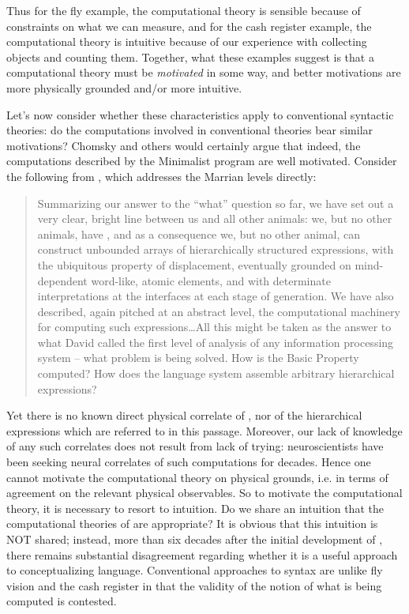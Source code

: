 Thus for the fly example, the computational theory is sensible because of constraints on what we can measure, and for the cash register example, the computational theory is intuitive because of our experience with collecting objects and counting them. Together, what these examples suggest is that a computational theory must be \textit{motivated} in some way, and better motivations are more physically grounded and/or more intuitive. 

Let's now consider whether these characteristics apply to conventional syntactic theories: do the computations involved in conventional theories bear similar motivations? Chomsky and others would certainly argue that indeed, the computations described by the Minimalist program are well motivated. Consider the following from \citet{BerwickChomsky2016}, which addresses the Marrian levels directly:

\begin{quote} 
Summarizing our answer to the “what” question so far, we have set out a very clear, bright line between us and all other animals: we, but no other animals, have , and as a consequence we, but no other animal, can construct unbounded arrays of hierarchically structured expressions, with the ubiquitous property of displacement, eventually grounded on mind-de\-pen\-dent word-like, atomic elements, and with determinate interpretations at the interfaces at each stage of generation. We have also described, again pitched at an abstract level, the computational machinery for computing such expressions…All this might be taken as the answer to what David \citet{Marr1982} called the first level of analysis of any information processing system -- what problem is being solved. How is the Basic Property computed? How does the language system assemble arbitrary hierarchical expressions? \citep[132]{BerwickChomsky2016}
\end{quote}

Yet there is no known direct physical correlate of , nor of the hierarchical expressions which are referred to in this passage. Moreover, our lack of knowledge of any such correlates does not result from lack of trying: neuroscientists have been seeking neural correlates of such computations for decades. Hence one cannot motivate the computational theory on physical grounds, i.e. in terms of agreement on the relevant physical observables. So to motivate the computational theory, it is necessary to resort to intuition. Do we share an intuition that the computational theories of  are appropriate? It is obvious that this intuition is NOT shared; instead, more than six decades after the initial development of , there remains substantial disagreement regarding whether it is a useful approach to conceptualizing language. Conventional approaches to syntax are unlike fly vision and the cash register in that the validity of the notion of what is being computed is contested.

